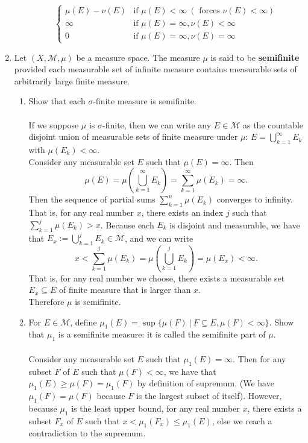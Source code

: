 \begin{enumerate}
\begin{enumerate}[label=(\roman*),align=left]
\[\begin{cases}
			\mu(E)-\nu(E)&\text{if }\mu(E)<\infty\ (\text{ forces }\nu(E)<\infty)\\
			\infty&\text{if }\mu(E)=\infty,\nu(E)<\infty\\
			0&\text{if }\mu(E)=\infty,\nu(E)=\infty
		\end{cases}
		\]
	\end{enumerate}
	\item Let $(X,\mathcal{M},\mu)$ be a measure space.
	The measure $\mu$ is said to be \textbf{semifinite} provided each measurable set of infinite measure contains measurable sets of arbitrarily large finite measure.
	\begin{enumerate}[label=(\roman*),align=left]  
		\item Show that each $\sigma$-finite measure is semifinite.\\
		\\If we suppose $\mu$ is $\sigma$-finite, then we can write any $E\in\mathcal{M}$ as the countable disjoint union of measurable sets of finite measure under $\mu$:
		$E=\bigcup_{k=1}^\infty E_k$ with $\mu(E_k)<\infty$.
		\\Consider any measurable set $E$ such that $\mu(E)=\infty$.
		Then 
		\[
			\mu(E)=\mu(\bigcup_{k=1}^\infty E_k)=\sum_{k=1}^\infty \mu(E_k)=\infty.
		\]
		Then the sequence of partial sums $\sum_{k=1}^n \mu(E_k)$ converges to infinity.
		That is, for any real number $x$, there exists an index $j$ such that $\sum_{k=1}^j \mu(E_k)>x$.
		Because each $E_k$ is disjoint and measurable, we have that $E_x:=\bigcup_{k=1}^j E_k\in\mathcal{M}$, and we can write
		\[
			x<\sum_{k=1}^j \mu(E_k)=\mu(\bigcup_{k=1}^j E_k)=\mu(E_x)<\infty.
		\]
		That is, for any real number we choose, there exists a measurable set $E_x\subseteq E$ of finite measure that is larger than $x$.
		\\Therefore $\mu$ is semifinite.
		\item For $E\in\mathcal{M}$, define $\mu_1(E)=\sup\{\mu(F)\ |\ F\subseteq E,\mu(F)<\infty\}$. 
		Show that $\mu_1$ is a semifinite measure: it is called the semifinite part of $\mu$.\\
		\\Consider any measurable set $E$ such that $\mu_1(E)=\infty$.
		Then for any subset $F$ of $E$ such that $\mu(F)<\infty$, we have that $\mu_1(E)\ge\mu(F)=\mu_1(F)$ by definition of supremum.
		(We have $\mu_1(F)=\mu(F)$ because $F$ is the largest subset of itself).
		However, because $\mu_1$ is the least upper bound, for any real number $x$, there exists a subset $F_x$ of $E$ such that $x<\mu_1(F_x)\le\mu_1(E)$, else we reach a contradiction to the supremum.

\end{enumerate}
\end{enumerate}

